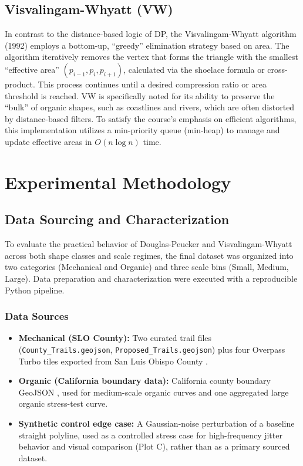 \documentclass[12pt]{article}
\begin{document}
\subsection{Visvalingam-Whyatt (VW)}
In contrast to the distance-based logic of DP, the Visvalingam-Whyatt algorithm (1992) \cite{vw1992} employs a bottom-up, ``greedy'' elimination strategy based on area. The algorithm iteratively removes the vertex that forms the triangle with the smallest ``effective area'' $(p_{i-1}, p_i, p_{i+1})$, calculated via the shoelace formula or cross-product. This process continues until a desired compression ratio or area threshold is reached. VW is specifically noted for its ability to preserve the ``bulk'' of organic shapes, such as coastlines and rivers, which are often distorted by distance-based filters. To satisfy the course's emphasis on efficient algorithms, this implementation utilizes a min-priority queue (min-heap) to manage and update effective areas in $O(n \log n)$ time.

\section{Experimental Methodology}

\subsection{Data Sourcing and Characterization}
To evaluate the practical behavior of Douglas-Peucker and Visvalingam-Whyatt across both shape classes and scale regimes, the final dataset was organized into two categories (Mechanical and Organic) and three scale bins (Small, Medium, Large). Data preparation and characterization were executed with a reproducible Python pipeline.

\subsubsection{Data Sources}
\begin{sloppypar}
\begin{itemize}
    \item \textbf{Mechanical (SLO County):} Two curated trail files (\texttt{County\_Trails.geojson}, \texttt{Proposed\_Trails.geojson}) \cite{slo_gis_hub} plus four Overpass Turbo tiles exported from San Luis Obispo County \cite{overpass_turbo}.
    \item \textbf{Organic (California boundary data):} California county boundary GeoJSON \cite{ca_open_data}, used for medium-scale organic curves and one aggregated large organic stress-test curve.
    \item \textbf{Synthetic control edge case:} A Gaussian-noise perturbation of a baseline straight polyline, used as a controlled stress case for high-frequency jitter behavior and visual comparison (Plot C), rather than as a primary sourced dataset.
\end{itemize}
\end{sloppypar}
\end{document}
